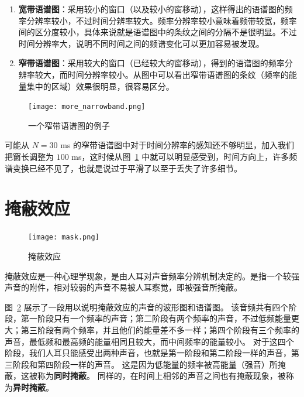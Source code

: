 \begin{enumerate}
  \item \textbf{宽带语谱图}：采用较小的窗口（以及较小的窗移动），这样得出的语谱图的频率分辨率较小，不过时间分辨率较大。频率分辨率较小意味着频带较宽，频率间的区分度较小，具体来说就是语谱图中的条纹之间的分隔不是很明显。不过时间分辨率大，说明不同时间之间的频谱变化可以更加容易被发现。
  \item \textbf{窄带语谱图}：采用较大的窗口（已经较大的窗移动），得到的语谱图的频率分辨率较大，而时间分辨率较小。从图中可以看出窄带语谱图的条纹（频率的能量集中的区域）效果很明显，很容易区分。
\end{enumerate}

\begin{figure}[!htp]
  \centering
  \texttt{[image: more\_narrowband.png]}
  \caption{一个窄带语谱图的例子}
  \label{fig:narrowband}
\end{figure}

可能从 $N = 30$ ms 的窄带语谱图中对于时间分辨率的感知还不够明显，加入我们把窗长调整为 $100$ ms，这时候从图~\ref{fig:narrowband} 中就可以明显感受到，时间方向上，许多频谱变换已经不见了，也就是说过于平滑了以至于丢失了许多细节。

\section{掩蔽效应}

\begin{figure}[!htp]
  \centering
  \texttt{[image: mask.png]}
  \caption{掩蔽效应}
  \label{fig:mask}
\end{figure}

掩蔽效应是一种心理学现象，是由人耳对声音频率分辨机制决定的。是指一个较强声音的附件，相对较弱的声音不易被人耳察觉，即被强音所掩蔽。

图~\ref{fig:mask} 展示了一段用以说明掩蔽效应的声音的波形图和语谱图。
该音频共有四个阶段，第一阶段只有一个频率的声音；第二阶段有两个频率的声音，不过低频能量更大；第三阶段有两个频率，并且他们的能量差不多一样；第四个阶段有三个频率的声音，最低频和最高频的能量相同且较大，而中间频率的能量较小。
对于这四个阶段，我们人耳只能感受出两种声音，也就是第一阶段和第二阶段一样的声音，第三阶段和第四阶段一样的声音。
这是因为低能量的频率被高能量（强音）所掩蔽，这被称为\textbf{同时掩蔽}。
同样的，在时间上相邻的声音之间也有掩蔽现象，被称为\textbf{异时掩蔽}。


